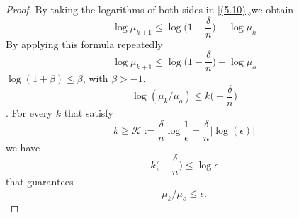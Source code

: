 \documentclass[a4paper,10 pt,titlepage,twoside]{book}
\theoremstyle{plain}
\theoremstyle{definition}
\theoremstyle{remark}
\begin{document}
\begin{proof}
	By taking the logarithms of both sides in \ref{(5.10)},we obtain
	\begin{equation*}
	\log\mu_{k+1}\leq \log \bigg(1-\frac{\delta}{n}\bigg)+\log\mu_{k}\end{equation*}
	By applying this formula repeatedly
	\begin{equation*}
	\log\mu_{k+1}\leq \log \bigg(1-\frac{\delta}{n}\bigg)+\log\mu_{o}
	\end{equation*}
	 $\log(1+\beta)\leq\beta$, with $\beta>-1$.\\
	\begin{equation*}
	\log(\mu_{k}/\mu_{o})\leq k\bigg(-\frac{\delta}{n}\bigg)
	\end{equation*}.	
For every $k$ that satisfy
\begin{equation*}
k\geq\mathcal{K}:= \frac{\delta}{n}\log\frac{1}{\epsilon} = \frac{\delta}{n}|\log(\epsilon)|
\end{equation*}
we have 
\begin{equation*}
k\bigg(-\frac{\delta}{n}\bigg)\leq\log\epsilon
\end{equation*}	
that guarantees
\begin{equation*}
\mu_{k}/\mu_{o}\leq\epsilon.
\end{equation*}	
\end{proof}
\end{document}
